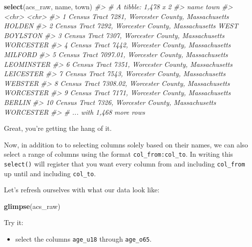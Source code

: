 \documentclass[
]{book}
\newenvironment{Shaded}{\begin{snugshade}}{\end{snugshade}}
\newcommand{\CommentTok}[1]{\textcolor[rgb]{0.56,0.35,0.01}{\textit{#1}}}
\newcommand{\KeywordTok}[1]{\textcolor[rgb]{0.13,0.29,0.53}{\textbf{#1}}}
\newcommand{\NormalTok}[1]{#1}
\providecommand{\tightlist}{%
  \setlength{\itemsep}{0pt}\setlength{\parskip}{0pt}}
\begin{document}
\begin{Shaded}
\begin{Highlighting}[]
\KeywordTok{select}\NormalTok{(acs\_raw, name, town)}
\CommentTok{\#\textgreater{} \# A tibble: 1,478 x 2}
\CommentTok{\#\textgreater{}    name                                                  town         }
\CommentTok{\#\textgreater{}    \textless{}chr\textgreater{}                                                 \textless{}chr\textgreater{}        }
\CommentTok{\#\textgreater{}  1 Census Tract 7281, Worcester County, Massachusetts    HOLDEN       }
\CommentTok{\#\textgreater{}  2 Census Tract 7292, Worcester County, Massachusetts    WEST BOYLSTON}
\CommentTok{\#\textgreater{}  3 Census Tract 7307, Worcester County, Massachusetts    WORCESTER    }
\CommentTok{\#\textgreater{}  4 Census Tract 7442, Worcester County, Massachusetts    MILFORD      }
\CommentTok{\#\textgreater{}  5 Census Tract 7097.01, Worcester County, Massachusetts LEOMINSTER   }
\CommentTok{\#\textgreater{}  6 Census Tract 7351, Worcester County, Massachusetts    LEICESTER    }
\CommentTok{\#\textgreater{}  7 Census Tract 7543, Worcester County, Massachusetts    WEBSTER      }
\CommentTok{\#\textgreater{}  8 Census Tract 7308.02, Worcester County, Massachusetts WORCESTER    }
\CommentTok{\#\textgreater{}  9 Census Tract 7171, Worcester County, Massachusetts    BERLIN       }
\CommentTok{\#\textgreater{} 10 Census Tract 7326, Worcester County, Massachusetts    WORCESTER    }
\CommentTok{\#\textgreater{} \# ... with 1,468 more rows}
\end{Highlighting}
\end{Shaded}

Great, you're getting the hang of it.

Now, in addition to to selecting columns solely based on their names, we can also select a range of columns using the format \texttt{col\_from:col\_to}. In writing this \texttt{select()} will register that you want every column from and including \texttt{col\_from} up until and including \texttt{col\_to}.

Let's refresh ourselves with what our data look like:

\begin{Shaded}
\begin{Highlighting}[]
\KeywordTok{glimpse}\NormalTok{(acs\_raw)}
\end{Highlighting}
\end{Shaded}

Try it:

\begin{itemize}
\tightlist
\item
  select the columns \texttt{age\_u18} through \texttt{age\_o65}.
\end{itemize}
\end{document}
